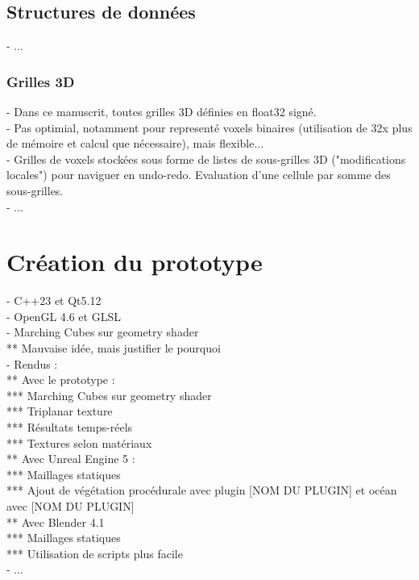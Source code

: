\subsection{Structures de données}
- ...

\subsubsection{Grilles 3D}
- Dans ce manuscrit, toutes grilles 3D définies en float32 signé. \\
- Pas optimial, notamment pour representé voxels binaires (utilisation de 32x plus de mémoire et calcul que nécessaire), mais flexible... \\
- Grilles de voxels stockées sous forme de listes de sous-grilles 3D ("modifications locales") pour naviguer en undo-redo. Evaluation d'une cellule par somme des sous-grilles. \\
- ...


\section{Création du prototype}
\label{sec:introduction_prototype}
- C++23 et Qt5.12 \\
- OpenGL 4.6 et GLSL \\
- Marching Cubes sur geometry shader \\
** Mauvaise idée, mais justifier le pourquoi \\
- Rendus :\\
** Avec le prototype : \\
*** Marching Cubes sur geometry shader \\
*** Triplanar texture \\
*** Résultats temps-réels \\
*** Textures selon matériaux \\
** Avec Unreal Engine 5 : \\
*** Maillages statiques \\
*** Ajout de végétation procédurale avec plugin [NOM DU PLUGIN] et océan avec [NOM DU PLUGIN] \\
** Avec Blender 4.1 \\
*** Maillages statiques \\
*** Utilisation de scripts plus facile \\
- ...

